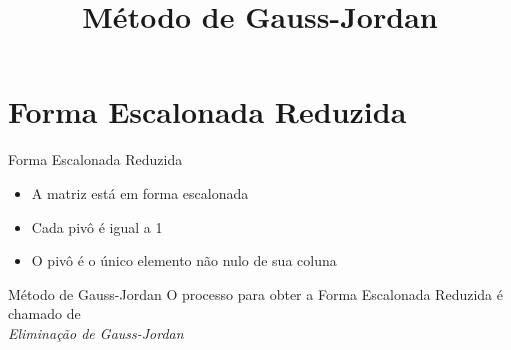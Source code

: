 \documentclass[fleqn,aspectratio=169,12pt]{beamer}
\title{Método de Gauss-Jordan}
\begin{document}
\addtitle

\section{Forma Escalonada Reduzida}

\begin{frame}{Forma Escalonada Reduzida}
  \begin{itemize}[<+->]
    \item A matriz está em forma escalonada
    \item Cada pivô é igual a 1
    \item O pivô é o único elemento não nulo de sua coluna
  \end{itemize}

\bigskip
{}
\end{frame}

\begin{frame}{Método de Gauss-Jordan}
  O processo para obter a Forma Escalonada Reduzida é chamado de \\[3mm]
  \emph{Eliminação de Gauss-Jordan}
\end{frame}






%
%

\end{document}
